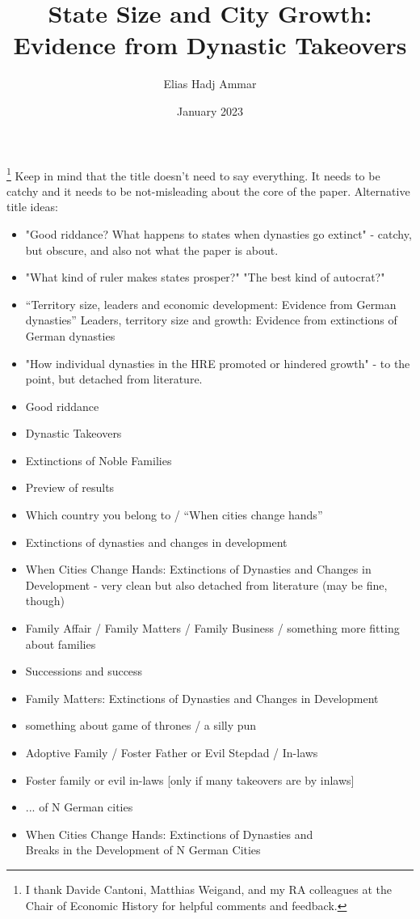 \documentclass{article}
\title{State Size and City Growth: \\Evidence from Dynastic Takeovers}
\author{Elias Hadj Ammar}
\date{January 2023}
\begin{document}
\maketitle
\footnote{I thank Davide Cantoni, Matthias Weigand, and my RA colleagues at the Chair of Economic History for helpful comments and feedback.}
Keep in mind that the title doesn't need to say everything. It needs to be catchy and it needs to be not-misleading about the core of the paper.
Alternative title ideas: 
\begin{itemize}
    \item "Good riddance? What happens to states when dynasties go extinct" - catchy, but obscure, and also not what the paper is about.
    \item "What kind of ruler makes states prosper?" "The best kind of autocrat?"
    \item ``Territory size, leaders and economic development: Evidence from German dynasties'' {Leaders, territory size and growth: Evidence from extinctions of German dynasties}

    \item "How individual dynasties in the HRE promoted or hindered growth" - to the point, but detached from literature.
    \item Good riddance
    \item Dynastic Takeovers
    \item Extinctions of Noble Families
    \item Preview of results
    \item Which country you belong to / ``When cities change hands''
    \item {Extinctions of dynasties and changes in development}
    \item {When Cities Change Hands: Extinctions of Dynasties and Changes in Development} - very clean but also detached from literature (may be fine, though)
    \item Family Affair / Family Matters / Family Business / something more fitting about families
    \item Successions and success
    \item {Family Matters: Extinctions of Dynasties and Changes in Development}
    \item something about game of thrones / a silly pun
    \item Adoptive Family / Foster Father or Evil Stepdad / In-laws
    \item Foster family or evil in-laws [only if many takeovers are by inlaws]
    \item ... of N German cities
    \item {When Cities Change Hands: Extinctions of Dynasties and \\Breaks in the Development of N German Cities}
\end{itemize}
\end{document}
